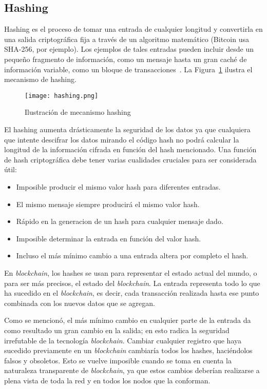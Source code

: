 \subsection{Hashing}

Hashing es el proceso de tomar una entrada de cualquier longitud y convertirla en una salida criptográfica fija a través de un algoritmo matemático (Bitcoin usa SHA-256, por ejemplo). Los ejemplos de tales entradas pueden incluir desde un pequeño fragmento de información, como un mensaje hasta un gran caché de información variable, como un bloque de transacciones~\cite{liskacademy:blockchainCryptographyExplained}. La Figura~\ref{blockcain_hashing} ilustra el mecanismo de hashing.

\begin{figure}[h]
    \centering
    \texttt{[image: hashing.png]}
     \caption{Ilustración de mecanismo hashing} 
    \label{blockcain_hashing}
\end{figure}

El hashing aumenta drásticamente la seguridad de los datos ya que cualquiera que intente descifrar los datos mirando  el código  hash no podrá calcular la longitud de la información cifrada en función del hash mencionado. Una función de hash criptográfica debe tener varias cualidades cruciales para ser considerada útil:
\begin{itemize}
    \item Imposible producir el mismo valor hash para diferentes entradas.
    \item El mismo mensaje siempre producirá el mismo valor hash.
    \item Rápido en  la  generacion de un hash para cualquier mensaje dado.
    \item Imposible determinar la entrada en función del valor hash.
    \item Incluso el más mínimo cambio a una entrada altera por completo el hash.
\end{itemize}

En \textit{blockchain}, los hashes se usan para representar el estado actual del mundo, o para ser más precisos, el estado del \textit{blockchain}. La entrada representa todo lo que ha sucedido en el \textit{blockchain}, es decir, cada transacción realizada hasta ese punto combinada con los nuevos datos que se agregan.

Como se mencionó, el más mínimo cambio en cualquier parte de la entrada da como resultado un gran cambio en la salida; en esto radica la seguridad irrefutable de la tecnología \textit{blockchain}. Cambiar cualquier registro que haya sucedido previamente en un \textit{blockchain} cambiaría todos los hashes, haciéndolos falsos y obsoletos. Esto se vuelve imposible cuando se toma en cuenta la naturaleza transparente de \textit{blockchain}, ya que estos cambios deberían realizarse a plena vista de toda la red y en todos los nodos que la conforman.


